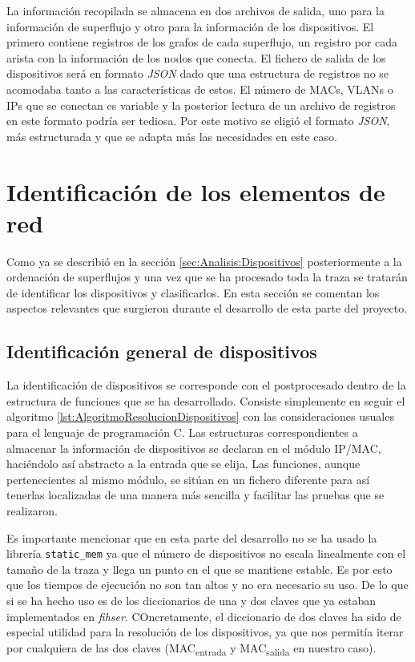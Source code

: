 \documentclass[twoside, 12pt]{epstfg}
\begin{document}
La información recopilada se almacena en dos archivos de salida, uno para la información de superflujo y otro para la información de los dispositivos. El primero contiene registros de los grafos de cada superflujo, un registro por cada arista con la información de los nodos que conecta. El fichero de salida de los dispositivos será en formato \textit{JSON} dado que una estructura de registros no se acomodaba tanto a las características de estos. El número de MACs, VLANs o IPs que se conectan es variable y la posterior lectura de un archivo de registros en este formato podría ser tediosa. Por este motivo se eligió el formato \textit{JSON}, más estructurada y que se adapta más las necesidades en este caso.

\section{Identificación de los elementos de red}
Como ya se describió en la sección \ref{sec:Analisis:Dispositivos} posteriormente a la ordenación de superflujos y una vez que se ha procesado toda la traza se tratarán de identificar los dispositivos y clasificarlos. En esta sección se comentan los aspectos relevantes que surgieron durante el desarrollo de esta parte del proyecto.

\subsection{Identificación general de dispositivos}
La identificación de dispositivos se corresponde con el postprocesado dentro de la estructura de funciones que se ha desarrollado. Consiste simplemente en seguir el algoritmo \ref{lst:AlgoritmoResolucionDispositivos} con las consideraciones usuales para el lenguaje de programación C. Las estructuras correspondientes a almacenar la información de dispositivos se declaran en el módulo IP/MAC, haciéndolo así abstracto a la entrada que se elija. Las funciones, aunque pertenecientes al mismo módulo, se sitúan en un fichero diferente para así tenerlas localizadas de una manera más sencilla y facilitar las pruebas que se realizaron.

Es importante mencionar que en esta parte del desarrollo no se ha usado la librería \texttt{static\_mem} ya que el número de dispositivos no escala linealmente con el tamaño de la traza y llega un punto en el que se mantiene estable. Es por esto que los tiempos de ejecución no son tan altos y no era necesario su uso. De lo que si se ha hecho uso es de los diccionarios de una y dos claves que ya estaban implementados en \textit{fihser}. COncretamente, el diccionario de dos claves ha sido de especial utilidad para la resolución de los dispositivos, ya que nos permitía iterar por cualquiera de las dos claves (MAC\textsubscript{entrada} y MAC\textsubscript{salida} en nuestro caso).
\end{document}
